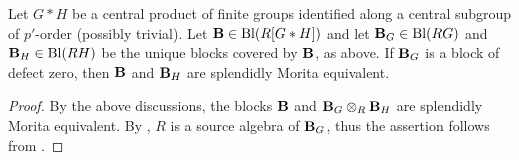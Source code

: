 \begin{lem}\label{lem:SplendidMoritaEquivalence_direct_and_central_product}%
Let $G\ast H$ be a central product of finite groups identified along a central subgroup of $p'$-order (possibly trivial).
Let ${\mathbf{B}} \in\operatorname{Bl}(R[G\ast H])$ and let ${\mathbf{B}}_G\in\operatorname{Bl}(RG)$ and ${\mathbf{B}}_H\in\operatorname{Bl}(RH)$ be the unique blocks covered by ${\mathbf{B}}$, as above. If ${\mathbf{B}}_G$ is a block of defect zero, then ${\mathbf{B}}$ and ${\mathbf{B}}_H$ are splendidly Morita equivalent. 
\end{lem}

\begin{proof}
By the above discussions, the blocks ${\mathbf{B}}$ and ${\mathbf{B}}_G\otimes_R{\mathbf{B}}_H$ are splendidly Morita equivalent. By \cite[p.\,341, line -9]{ThevenazBook}, $R$ is a source algebra of ${\mathbf{B}}_G$, thus the assertion follows from \cite[Lemma 2.6(i)]{KMN11}.
\end{proof}






\vspace{2mm}
